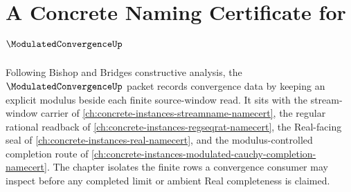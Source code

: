 \chapter{A Concrete Naming Certificate for $\ModulatedConvergenceUp$}
\label{ch:concrete-instances-modulated-convergence-namecert}

Following Bishop and Bridges constructive analysis, the $\ModulatedConvergenceUp$ packet records convergence data by keeping an explicit modulus beside each finite source-window read. It sits with the stream-window carrier of \autoref{ch:concrete-instances-streamname-namecert}, the regular rational readback of \autoref{ch:concrete-instances-regseqrat-namecert}, the Real-facing seal of \autoref{ch:concrete-instances-real-namecert}, and the modulus-controlled completion route of \autoref{ch:concrete-instances-modulated-cauchy-completion-namecert}. The chapter isolates the finite rows a convergence consumer may inspect before any completed limit or ambient Real completeness is claimed.

